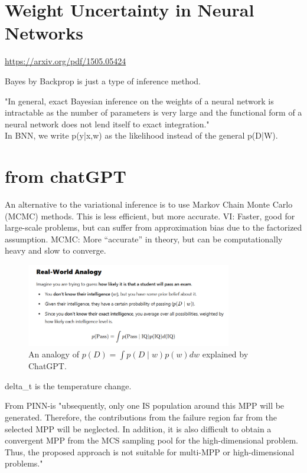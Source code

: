 \section{Weight Uncertainty in Neural Networks}
\url{https://arxiv.org/pdf/1505.05424}

Bayes by Backprop is just a type of inference method.

"In general, exact Bayesian inference on the weights of a neural network is intractable as the number of parameters is very large and the functional form of a neural network does not lend itself to exact integration."
\\
In BNN, we write p(y|x,w) as the likelihood instead of the general p(D|W). 


\section{from chatGPT}

An alternative to the variational inference is to use Markov Chain Monte Carlo (MCMC) methods. This is less efficient, but more accurate. 
VI: Faster, good for large-scale problems, but can suffer from approximation bias due to the factorized assumption.
MCMC: More “accurate” in theory, but can be computationally heavy and slow to converge.

\begin{figure}
  \centering
  \includegraphics[width=0.8\textwidth]{figures/analogy_chatGPT.png}
  \caption{An analogy of \( p(D)=\int p(D \mid w)p(w)dw \) explained by ChatGPT.}
  \label{fig:analogy_chatGPT_unique}
\end{figure}



\gls{delta_t} is the temperature change.

From PINN-is
"ubsequently, only one IS population around this MPP will be generated. Therefore, the contributions from the failure region far from the selected MPP will be neglected. In addition, it is also difficult to obtain a convergent MPP from the MCS sampling pool for the high-dimensional problem. Thus, the proposed approach is not suitable for multi-MPP or high-dimensional problems."

